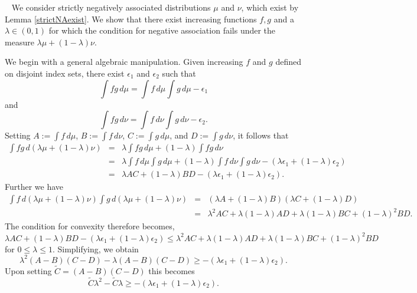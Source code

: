 \documentclass[11pt]{article}
\newenvironment{Proof}{\noindent{\bf Proof} \ }{\QED}\smallskip
\newcommand\QED{\newline \rightline{$\blacksquare$} \bigskip}
\begin{document}
\begin{Proof}
We consider strictly negatively associated distributions $\mu$ and 
$\nu$, which exist by Lemma \ref{strictNAexist}. We show that there exist increasing functions $f,g$ and a $\lambda\in (0,1)$ for which the condition for negative association fails under the measure $\lambda\mu +(1-\lambda)\nu$. 

We begin with a general algebraic manipulation. Given increasing $f$ and $g$ defined on disjoint index sets,
there exist $\epsilon_1$ and $\epsilon_2$ such that 
\[
\int fg \, d\mu = \int f \, d\mu \int g \, d\mu -\epsilon_1
\]
and 
\[
\int fg \, d\nu = \int f \, d\nu \int g \, d\nu -\epsilon_2.
\]
Setting $A:= \int f\, d\mu$, 
$B:= \int f \, d\nu$, $C:= \int g \, d\mu$,
and $D := \int g\, d\nu$,
it follows that 
\begin{eqnarray*}
\int fg \, d(\lambda\mu+(1-\lambda)\nu) &=& \lambda\int fg\,d\mu +(1-\lambda)\int fg \, d\nu \\
&=& \lambda\int f \,d\mu \int g\,d\mu +(1-\lambda)\int f\, d\nu \int g \, d\nu 
-(\lambda\epsilon_1+(1-\lambda)\epsilon_2)\\
&=& \lambda AC+(1-\lambda)BD-(\lambda\epsilon_1+(1-\lambda)\epsilon_2).
\end{eqnarray*}
Further we have
\begin{eqnarray*}
\int f \, d(\lambda\mu+(1-\lambda)\nu) \int g \, d(\lambda\mu+(1-\lambda)\nu) &=&
(\lambda A +(1-\lambda)B)
(\lambda C +(1-\lambda)D)\\
&=&
\lambda^2 AC + \lambda(1-\lambda)AD
+\lambda(1-\lambda)BC + (1-\lambda)^2BD.
\end{eqnarray*}
The condition for convexity therefore becomes,
\[
\lambda AC +(1-\lambda)BD
-(\lambda\epsilon_1+(1-\lambda)\epsilon_2)
\leq \lambda^2 AC + \lambda(1-\lambda)AD
+\lambda(1-\lambda)BC + (1-\lambda)^2BD
\]
for $0\leq \lambda \leq 1.$ Simplifying, we obtain
\[
\lambda^2(A-B)(C-D) -\lambda(A-B)(C-D) \geq 
-(\lambda\epsilon_1+(1-\lambda)\epsilon_2).
\]
Upon setting $\tilde{C} = (A-B)(C-D)$ this becomes
\begin{equation}\label{convexity}
\tilde{C}\lambda^2 - \tilde{C} \lambda\geq 
-(\lambda\epsilon_1+(1-\lambda)\epsilon_2).
\end{equation}



\end{Proof}
\end{document}
